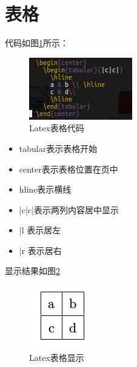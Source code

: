 \documentclass[a4paper,  11pt]{article}
\begin{document}
\section{表格}

代码如图\ref{fig:table}所示：

\begin{figure}[!htbp]
\centering
\includegraphics[scale=.7]{table2.png}
\caption{Latex表格代码}
\label{fig:table}
\end{figure}

\begin{itemize}
  \item tabular表示表格开始
  \item center表示表格位置在页中
  \item hline表示横线
  \item |c|c|表示两列内容居中显示
  \item |l 表示居左
  \item |r 表示居右
\end{itemize}


显示结果如图\ref{fig:table_1}

\begin{figure}[!htbp]
\centering
\includegraphics[scale=.4]{table_2.png}
\caption{Latex表格显示}
\label{fig:table_1}
\end{figure}
\end{document}
